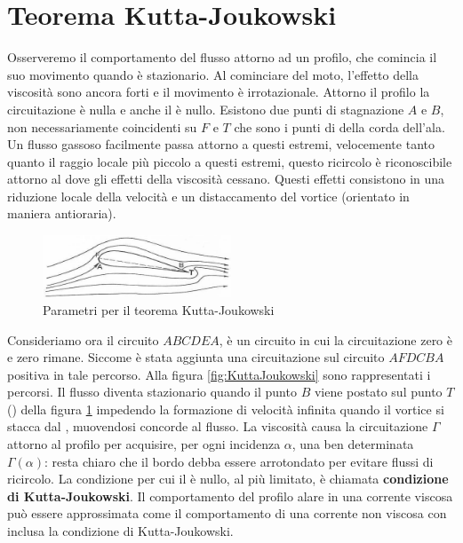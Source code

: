 \section{Teorema Kutta-Joukowski}
Osserveremo il comportamento del flusso attorno ad un profilo, che comincia il suo movimento quando è stazionario.
Al cominciare del moto, l'effetto della viscosità sono ancora forti e il movimento è irrotazionale. Attorno il profilo la circuitazione è nulla e anche il  è nullo.
Esistono due punti di stagnazione $A$ e $B$, non necessariamente coincidenti su $F$ e $T$ che sono i punti di della corda dell'ala.
Un flusso gassoso facilmente passa attorno a questi estremi, velocemente tanto quanto il raggio locale più piccolo a questi estremi, questo ricircolo è riconoscibile attorno al  dove gli effetti della viscosità cessano.
Questi effetti consistono in una riduzione locale della velocità e un distaccamento del vortice (orientato in maniera antioraria).

\begin{figure}
\centering
\includegraphics[width = 0.5\textwidth]{gfx/ParamKuttaJoukowski}
\caption{Parametri per il teorema Kutta-Joukowski}
\label{fig:ParamKuttaJoukowski}
\end{figure}

Consideriamo ora il circuito $ABCDEA$, è un circuito in cui la circuitazione zero è e zero rimane.
Siccome è stata aggiunta una circuitazione sul circuito $AFDCBA$ positiva in tale percorso.
Alla figura \ref{fig:KuttaJoukowski} sono rappresentati i percorsi.
Il flusso diventa stazionario quando il punto $B$ viene postato sul punto $T$() della figura \ref{fig:ParamKuttaJoukowski} impedendo la formazione di velocità infinita quando il vortice si stacca dal , muovendosi concorde al flusso.
La viscosità causa la circuitazione $\Gamma$ attorno al profilo per acquisire, per ogni incidenza $\alpha$, una ben determinata $\Gamma(\alpha)$: resta chiaro che il bordo debba essere arrotondato per evitare flussi di ricircolo.
La condizione per cui il  è nullo, al più limitato, è chiamata \textbf{condizione di Kutta-Joukowski}.
Il comportamento del profilo alare in una corrente viscosa può essere approssimata come il comportamento di una corrente non viscosa con inclusa la condizione di Kutta-Joukowski.

